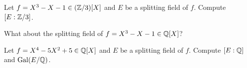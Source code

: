 \begin{exercise}
\label{xca:dec field of X^3-X-1 over Z3}
    Let $f=X^3-X-1\in (\mathbb{Z}/3)[X]$ and $E$ be a splitting field of $f$. 
    Compute $[E:\mathbb{Z}/3]$. 
\end{exercise}

What about the splitting field of $f=X^3-X-1\in \mathbb{Q}[X]$?

\begin{exercise}
\label{xca:dec field X^4-5X^2+5}
    Let $f=X^4-5X^2+5\in \mathbb{Q}[X]$ and $E$ be a splitting field of $f$. 
    Compute $[E:\mathbb{Q}]$ and $\operatorname{Gal}(E/\mathbb{Q})$. 
\end{exercise}



